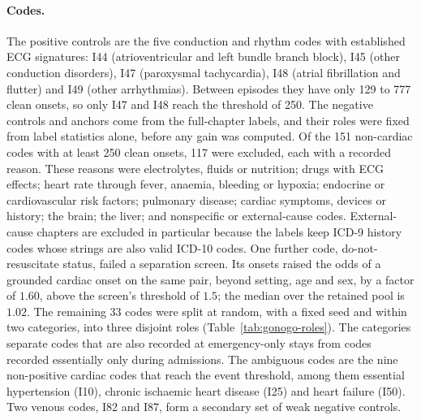 \paragraph{Codes.} The positive controls are the five conduction and rhythm codes with established ECG signatures: I44 (atrioventricular and left bundle branch block), I45 (other conduction disorders), I47 (paroxysmal tachycardia), I48 (atrial fibrillation and flutter) and I49 (other arrhythmias). Between episodes they have only 129 to 777 clean onsets, so only I47 and I48 reach the threshold of 250. The negative controls and anchors come from the full-chapter labels, and their roles were fixed from label statistics alone, before any gain was computed. Of the 151 non-cardiac codes with at least 250 clean onsets, 117 were excluded, each with a recorded reason. These reasons were electrolytes, fluids or nutrition; drugs with ECG effects; heart rate through fever, anaemia, bleeding or hypoxia; endocrine or cardiovascular risk factors; pulmonary disease; cardiac symptoms, devices or history; the brain; the liver; and nonspecific or external-cause codes. External-cause chapters are excluded in particular because the labels keep ICD-9 history codes whose strings are also valid ICD-10 codes. One further code, do-not-resuscitate status, failed a separation screen. Its onsets raised the odds of a grounded cardiac onset on the same pair, beyond setting, age and sex, by a factor of $1.60$, above the screen's threshold of $1.5$; the median over the retained pool is $1.02$. The remaining 33 codes were split at random, with a fixed seed and within two categories, into three disjoint roles (Table~\ref{tab:gonogo-roles}). The categories separate codes that are also recorded at emergency-only stays from codes recorded essentially only during admissions. The ambiguous codes are the nine non-positive cardiac codes that reach the event threshold, among them essential hypertension (I10), chronic ischaemic heart disease (I25) and heart failure (I50). Two venous codes, I82 and I87, form a secondary set of weak negative controls.

